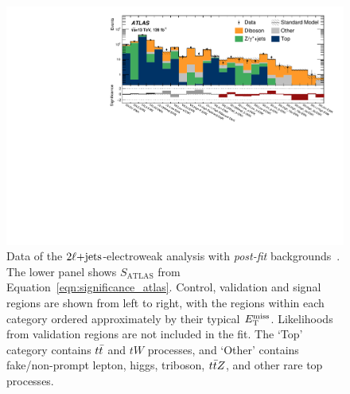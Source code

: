 \begin{figure}[tp]
\centering
\includegraphics[width=\textwidth]{figures/2ljets_summary_log.pdf}
\caption[
Data of the $\twoljets$-electroweak analysis with \emph{post-fit}
backgrounds
]{%
Data of the $\twoljets$-electroweak analysis with \emph{post-fit}
backgrounds~\cite{atlas2022searches}.
The lower panel shows $S_\mathrm{ATLAS}$ from
Equation~\ref{eqn:significance_atlas}.
Control, validation and signal regions are shown from left to right, with the
regions within each category ordered approximately by their typical $E_\mathrm{T}^\mathrm{miss}$.
Likelihoods from validation regions are not included in the fit.
The `Top' category contains $t\bar t$ and $tW$ processes, and
`Other' contains fake/non-prompt lepton, higgs, triboson, $t\bar t Z$, and other
rare top processes.%
}
\label{fig:2ljets_summary}
\end{figure}

